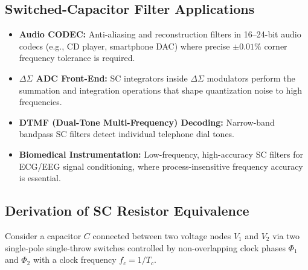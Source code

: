\documentclass[12pt,a4paper]{article}
\begin{document}
\subsection{Switched-Capacitor Filter Applications}
\begin{itemize}[leftmargin=*, itemsep=2.5pt]
  \item \textbf{Audio CODEC:} Anti-aliasing and reconstruction filters in 16--24-bit audio codecs (e.g., CD player, smartphone DAC) where precise $\pm 0.01\%$ corner frequency tolerance is required.
  \item \textbf{$\Delta\Sigma$ ADC Front-End:} SC integrators inside $\Delta\Sigma$ modulators perform the summation and integration operations that shape quantization noise to high frequencies.
  \item \textbf{DTMF (Dual-Tone Multi-Frequency) Decoding:} Narrow-band bandpass SC filters detect individual telephone dial tones.
  \item \textbf{Biomedical Instrumentation:} Low-frequency, high-accuracy SC filters for ECG/EEG signal conditioning, where process-insensitive frequency accuracy is essential.
\end{itemize}

\subsection{Derivation of SC Resistor Equivalence}
Consider a capacitor $C$ connected between two voltage nodes $V_1$ and $V_2$ via two single-pole single-throw switches controlled by non-overlapping clock phases $\Phi_1$ and $\Phi_2$ with a clock frequency $f_c = 1/T_c$.

\begin{tcolorbox}[tikzbox, title={Switched-Capacitor Resistor Equivalence Circuit}]
\centering
{}
\end{tcolorbox}
\end{document}
